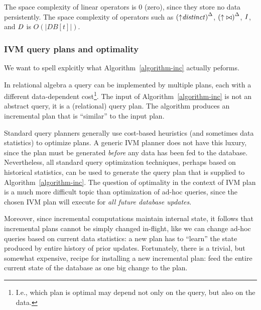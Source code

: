 The space complexity of linear operators is 0 (zero), since they store no
data persistently.  The space complexity of operators such as ${({\uparrow}\mathit{distinct})}^{\Delta}$,
${({\uparrow}\bowtie)}^{\Delta}$, $\mathit{I}$, and $\mathit{D}$ is $O(|DB[t]|)$.

\subsubsection{IVM query plans and optimality}

We want to spell explcitly what Algorithm~\ref{algorithm-inc} actually
peforms.

In relational algebra a query can be implemented by multiple plans,
each with a different data-dependent cost\footnote{I.e., which plan is
optimal may depend not only on the query, but also on the data.}.  The
input of Algorithm~\ref{algorithm-inc} is not an abstract query, it is
a (relational) query plan.  The algorithm produces an incremental plan
that is ``similar'' to the input plan.

Standard query planners generally use cost-based heuristics (and
sometimes data statistics) to optimize plans.  A generic IVM planner
does not have this luxury, since the plan must be generated
\emph{before} any data has been fed to the database.  Nevertheless,
all standard query optimization techniques, perhaps based on
historical statistics, can be used to generate the query plan that is
supplied to Algorithm~\ref{algorithm-inc}.  The question of optimality
in the context of IVM plan is a much more difficult topic than
optimization of ad-hoc queries, since the chosen IVM plan will execute
for \emph{all future database updates}.

Moreover, since incremental computations maintain internal state, it
follows that incremental plans cannot be simply changed in-flight,
like we can change ad-hoc queries based on current data statistics: a
new plan has to ``learn'' the state produced by entire history of
prior updates.  Fortunately, there is a trivial, but somewhat
expensive, recipe for installing a new incremental plan: feed the
entire current state of the database as one big change to the plan.


